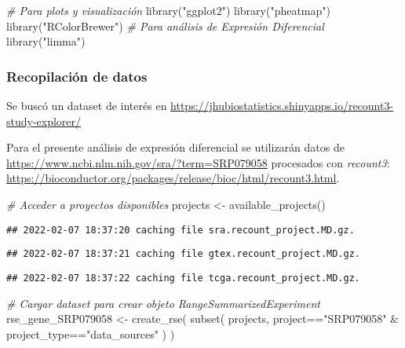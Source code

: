 \documentclass[
]{article}
\newenvironment{Shaded}{\begin{snugshade}}{\end{snugshade}}
\newcommand{\CommentTok}[1]{\textcolor[rgb]{0.56,0.35,0.01}{\textit{#1}}}
\newcommand{\FunctionTok}[1]{\textcolor[rgb]{0.00,0.00,0.00}{#1}}
\newcommand{\NormalTok}[1]{#1}
\newcommand{\OtherTok}[1]{\textcolor[rgb]{0.56,0.35,0.01}{#1}}
\newcommand{\SpecialCharTok}[1]{\textcolor[rgb]{0.00,0.00,0.00}{#1}}
\newcommand{\StringTok}[1]{\textcolor[rgb]{0.31,0.60,0.02}{#1}}
\begin{document}
\begin{Shaded}
\begin{Highlighting}[]
\CommentTok{\# Para plots y visualización}
\FunctionTok{library}\NormalTok{(}\StringTok{"ggplot2"}\NormalTok{)}
\FunctionTok{library}\NormalTok{(}\StringTok{"pheatmap"}\NormalTok{)}
\FunctionTok{library}\NormalTok{(}\StringTok{"RColorBrewer"}\NormalTok{)}
\CommentTok{\# Para análisis de Expresión Diferencial}
\FunctionTok{library}\NormalTok{(}\StringTok{"limma"}\NormalTok{)}
\end{Highlighting}
\end{Shaded}

\hypertarget{recopilaciuxf3n-de-datos}{%
\subsubsection{Recopilación de datos}\label{recopilaciuxf3n-de-datos}}

Se buscó un dataset de interés en
\url{https://jhubiostatistics.shinyapps.io/recount3-study-explorer/}

Para el presente análisis de expresión diferencial se utilizarán datos
de \url{https://www.ncbi.nlm.nih.gov/sra/?term=SRP079058} procesados con
\emph{recount3}:
\url{https://bioconductor.org/packages/release/bioc/html/recount3.html}.

\begin{Shaded}
\begin{Highlighting}[]
\CommentTok{\# Acceder a proyectos disponibles}
\NormalTok{projects }\OtherTok{\textless{}{-}} \FunctionTok{available\_projects}\NormalTok{()}
\end{Highlighting}
\end{Shaded}

\begin{verbatim}
## 2022-02-07 18:37:20 caching file sra.recount_project.MD.gz.
\end{verbatim}

\begin{verbatim}
## 2022-02-07 18:37:21 caching file gtex.recount_project.MD.gz.
\end{verbatim}

\begin{verbatim}
## 2022-02-07 18:37:22 caching file tcga.recount_project.MD.gz.
\end{verbatim}

\begin{Shaded}
\begin{Highlighting}[]
\CommentTok{\# Cargar dataset para crear objeto RangeSummarizedExperiment}
\NormalTok{rse\_gene\_SRP079058 }\OtherTok{\textless{}{-}} \FunctionTok{create\_rse}\NormalTok{(}
  \FunctionTok{subset}\NormalTok{(}
\NormalTok{    projects,}
\NormalTok{    project}\SpecialCharTok{==}\StringTok{"SRP079058"} \SpecialCharTok{\&}\NormalTok{ project\_type}\SpecialCharTok{==}\StringTok{"data\_sources"}
\NormalTok{  )}
\NormalTok{)}
\end{Highlighting}
\end{Shaded}
\end{document}
